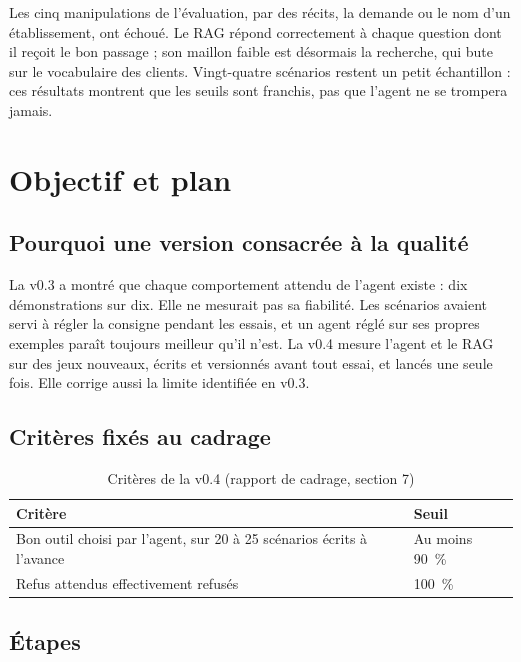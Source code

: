 \documentclass[11pt,a4paper]{article}
\begin{document}
Les cinq manipulations de l'évaluation, par des récits, la demande ou le nom d'un établissement, ont échoué. Le RAG répond correctement à chaque question dont il reçoit le bon passage ; son maillon faible est désormais la recherche, qui bute sur le vocabulaire des clients. Vingt-quatre scénarios restent un petit échantillon : ces résultats montrent que les seuils sont franchis, pas que l'agent ne se trompera jamais.

\setcounter{tocdepth}{1}
\tableofcontents
\newpage

\section{Objectif et plan}

\subsection{Pourquoi une version consacrée à la qualité}

La v0.3 a montré que chaque comportement attendu de l'agent existe : dix démonstrations sur dix. Elle ne mesurait pas sa fiabilité. Les scénarios avaient servi à régler la consigne pendant les essais, et un agent réglé sur ses propres exemples paraît toujours meilleur qu'il n'est. La v0.4 mesure l'agent et le RAG sur des jeux nouveaux, écrits et versionnés avant tout essai, et lancés une seule fois. Elle corrige aussi la limite identifiée en v0.3.

\subsection{Critères fixés au cadrage}

\begin{table}[H]
\centering\small
\begin{tabularx}{\linewidth}{@{}Y l@{}}
\toprule
Critère & Seuil \\
\midrule
Bon outil choisi par l'agent, sur 20 à 25 scénarios écrits à l'avance & Au moins 90~\% \\
Refus attendus effectivement refusés & 100~\% \\
\bottomrule
\end{tabularx}
\caption{Critères de la v0.4 (rapport de cadrage, section 7)}
\end{table}

\subsection{Étapes}
\end{document}
